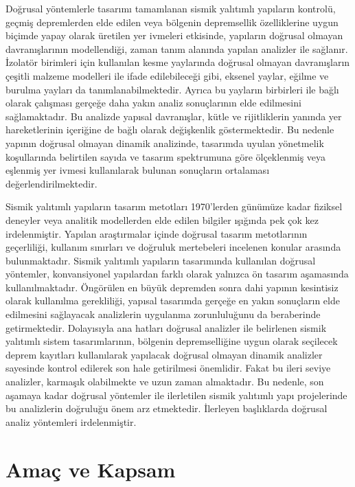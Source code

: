 Doğrusal yöntemlerle tasarımı tamamlanan sismik yalıtımlı yapıların
kontrolü, geçmiş depremlerden elde edilen veya bölgenin depremsellik
özelliklerine uygun biçimde yapay olarak üretilen yer ivmeleri etkisinde,
yapıların doğrusal olmayan davranışlarının modellendiği, zaman tanım
alanında yapılan analizler ile sağlanır. İzolatör birimleri için kullanılan
kesme yaylarında doğrusal olmayan davranışların çeşitli malzeme modelleri
ile ifade edilebileceği gibi, eksenel yaylar, eğilme ve burulma yayları
da tanımlanabilmektedir. Ayrıca bu yayların birbirleri ile bağlı olarak
çalışması gerçeğe daha yakın analiz sonuçlarının elde edilmesini sağlamaktadır.
Bu analizde yapısal davranışlar, kütle ve rijitliklerin yanında yer
hareketlerinin içeriğine de bağlı olarak değişkenlik göstermektedir.
Bu nedenle yapının doğrusal olmayan dinamik analizinde, tasarımda
uyulan yönetmelik koşullarında belirtilen sayıda ve tasarım spektrumuna
göre ölçeklenmiş veya eşlenmiş yer ivmesi kullanılarak bulunan sonuçların
ortalaması değerlendirilmektedir.

Sismik yalıtımlı yapıların tasarım metotları 1970'lerden günümüze
kadar fiziksel deneyler veya analitik modellerden elde edilen bilgiler
ışığında pek çok kez irdelenmiştir. Yapılan araştırmalar içinde doğrusal
tasarım metotlarının geçerliliği, kullanım sınırları ve doğruluk mertebeleri
incelenen konular arasında bulunmaktadır. Sismik yalıtımlı yapıların
tasarımında kullanılan doğrusal yöntemler, konvansiyonel yapılardan
farklı olarak yalnızca ön tasarım aşamasında kullanılmaktadır. Öngörülen
en büyük depremden sonra dahi yapının kesintisiz olarak kullanılma
gerekliliği, yapısal tasarımda gerçeğe en yakın sonuçların elde edilmesini
sağlayacak analizlerin uygulanma zorunluluğunu da beraberinde getirmektedir.
Dolayısıyla ana hatları doğrusal analizler ile belirlenen sismik yalıtımlı
sistem tasarımlarının, bölgenin depremselliğine uygun olarak seçilecek
deprem kayıtları kullanılarak yapılacak doğrusal olmayan dinamik analizler
sayesinde kontrol edilerek son hale getirilmesi önemlidir. Fakat bu
ileri seviye analizler, karmaşık olabilmekte ve uzun zaman almaktadır.
Bu nedenle, son aşamaya kadar doğrusal yöntemler ile ilerletilen sismik
yalıtımlı yapı projelerinde bu analizlerin doğruluğu önem arz etmektedir.
İlerleyen başlıklarda doğrusal analiz yöntemleri irdelenmiştir.

\section{Amaç ve Kapsam}

